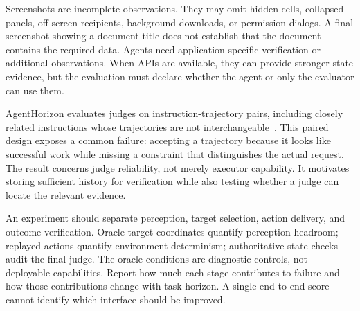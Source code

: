 Screenshots are incomplete observations. They may omit hidden cells, collapsed panels, off-screen recipients, background downloads, or permission dialogs. A final screenshot showing a document title does not establish that the document contains the required data. Agents need application-specific verification or additional observations. When APIs are available, they can provide stronger state evidence, but the evaluation must declare whether the agent or only the evaluator can use them.

AgentHorizon evaluates judges on instruction-trajectory pairs, including closely related instructions whose trajectories are not interchangeable~\cite{corpus261011050}. This paired design exposes a common failure: accepting a trajectory because it looks like successful work while missing a constraint that distinguishes the actual request. The result concerns judge reliability, not merely executor capability. It motivates storing sufficient history for verification while also testing whether a judge can locate the relevant evidence.

An experiment should separate perception, target selection, action delivery, and outcome verification. Oracle target coordinates quantify perception headroom; replayed actions quantify environment determinism; authoritative state checks audit the final judge. The oracle conditions are diagnostic controls, not deployable capabilities. Report how much each stage contributes to failure and how those contributions change with task horizon. A single end-to-end score cannot identify which interface should be improved.

